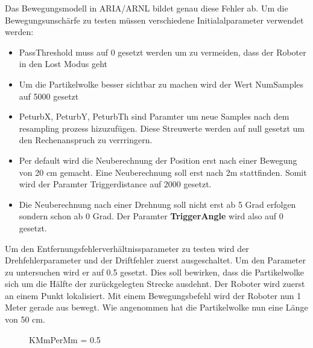 \documentclass{article}
\begin{document}
Das Bewegungsmodell in ARIA/ARNL bildet genau diese Fehler ab.
Um die Bewegungsunsch\"arfe zu testen m\"ussen verschiedene Initialalparameter verwendet werden:
\begin{itemize}
\item PassThreshold muss auf 0 gesetzt werden um zu vermeiden, dass der Roboter in den Lost Modus geht
\item Um die Partikelwolke besser sichtbar zu machen wird der Wert NumSamples auf 5000 gesetzt
\item PeturbX, PeturbY, PeturbTh sind Paramter um neue Samples nach dem resampling prozess hizuzuf\"ugen. Diese Streuwerte werden auf null gesetzt um den Rechenanspruch zu verrringern.
\item Per default wird die Neuberechnung der Position erst nach einer Bewegung von 20 cm gemacht. Eine Neuberechnung soll erst nach 2m stattfinden. Somit wird der Paramter Triggerdistance auf 2000 gesetzt. 
\item Die Neuberechnung nach einer Drehnung soll nicht erst ab 5 Grad erfolgen sondern schon ab 0 Grad. Der Paramter \textbf{TriggerAngle} wird also auf 0 gesetzt.
\end{itemize}

Um den Entfernungsfehlerverh\"altnissparameter zu testen wird der Drehfehlerparameter und der Driftfehler zuerst ausgeschaltet. Um den Parameter zu untersuchen wird er auf 0.5 gesetzt. Dies soll bewirken, dass die Partikelwolke sich um die H\"alfte der zur\"uckgelegten Strecke ausdehnt. Der Roboter wird zuerst an einem Punkt lokalisiert. Mit einem Bewegungsbefehl wird der Roboter nun 1 Meter gerade aus bewegt. Wie angenommen hat die Partikelwolke nun eine L\"ange von 50 cm. 

\begin{figure}
  \centering
  \caption{KMmPerMm = 0.5}
  \label{KMmPerMmTest}
\end{figure}
\end{document}
